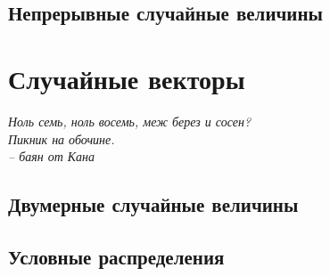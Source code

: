 \documentclass[12pt]{report}
\theoremstyle{plain}
\theoremstyle{definition}
\begin{document}
\section{Непрерывные случайные величины}

\chapter{Случайные векторы}
\begin{flushright}
    \textit{
        Ноль семь, ноль восемь, меж берез и сосен? \\
        Пикник на обочине. \\
        -- баян от Кана
    }
\end{flushright}
\section{Двумерные случайные величины}

\section{Условные распределения}
\end{document}
